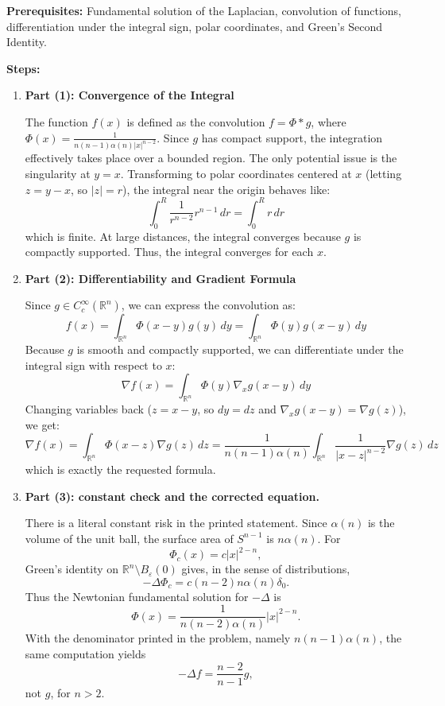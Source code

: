 \begin{solution}
\textbf{Prerequisites:} 
Fundamental solution of the Laplacian, convolution of functions, differentiation under the integral sign, polar coordinates, and Green's Second Identity.

\par\vspace{\baselineskip}
\textbf{Steps:}

\begin{enumerate}
    \item \textbf{Part (1): Convergence of the Integral}

    The function $f(x)$ is defined as the convolution $f = \Phi * g$, where $\Phi(x) = \frac{1}{n(n-1)\alpha(n)|x|^{n-2}}$. Since $g$ has compact support, the integration effectively takes place over a bounded region. The only potential issue is the singularity at $y=x$.
    Transforming to polar coordinates centered at $x$ (letting $z = y-x$, so $|z| = r$), the integral near the origin behaves like:
    \[
    \int_0^R \frac{1}{r^{n-2}} r^{n-1} \, dr = \int_0^R r \, dr
    \]
    which is finite. At large distances, the integral converges because $g$ is compactly supported. Thus, the integral converges for each $x$.

    \item \textbf{Part (2): Differentiability and Gradient Formula}

    Since $g \in C_c^\infty(\mathbb{R}^n)$, we can express the convolution as:
    \[
    f(x) = \int_{\mathbb{R}^n} \Phi(x-y) g(y) \, dy = \int_{\mathbb{R}^n} \Phi(y) g(x-y) \, dy
    \]
    Because $g$ is smooth and compactly supported, we can differentiate under the integral sign with respect to $x$:
    \[
    \nabla f(x) = \int_{\mathbb{R}^n} \Phi(y) \nabla_x g(x-y) \, dy
    \]
    Changing variables back ($z = x-y$, so $dy = dz$ and $\nabla_x g(x-y) = \nabla g(z)$), we get:
    \[
    \nabla f(x) = \int_{\mathbb{R}^n} \Phi(x-z) \nabla g(z) \, dz = \frac{1}{n(n-1)\alpha(n)} \int_{\mathbb{R}^n} \frac{1}{|x-z|^{n-2}} \nabla g(z) \, dz
    \]
    which is exactly the requested formula.

    \item \textbf{Part (3): constant check and the corrected equation.}

    There is a literal constant risk in the printed statement.  Since $\alpha(n)$ is the volume of the unit ball, the surface area of $S^{n-1}$ is $n\alpha(n)$.  For
    \[
    \Phi_c(x)=c|x|^{2-n},
    \]
    Green's identity on $\mathbb{R}^n\setminus B_\varepsilon(0)$ gives, in the sense of distributions,
    \[
    -\Delta\Phi_c=c(n-2)n\alpha(n)\delta_0.
    \]
    Thus the Newtonian fundamental solution for $-\Delta$ is
    \[
    \Phi(x)=\frac{1}{n(n-2)\alpha(n)}|x|^{2-n}.
    \]
    With the denominator printed in the problem, namely $n(n-1)\alpha(n)$, the same computation yields
    \[
    -\Delta f=\frac{n-2}{n-1}g,
    \]
    not $g$, for $n>2$.


\end{enumerate}
\end{solution}
